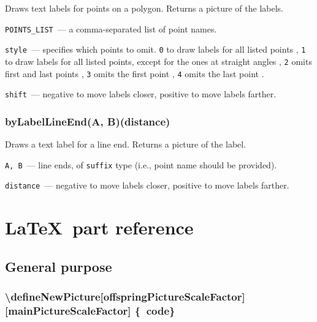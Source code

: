 	Draws text labels for points on a polygon. Returns a picture of the labels.
	
	
	\texttt{POINTS\_LIST}~— a comma-separated list of point names.
	
	\texttt{style}~— specifies which points to omit. \texttt{0} to draw labels for all listed points
	, \texttt{1} to draw labels for all listed points, except for the ones at straight angles
	, \texttt{2} omits first and last points
	, \texttt{3} omits the first point
	, \texttt{4} omits the last point
	.
	
	\texttt{shift}~— negative to move labels closer, positive to move labels farther.

\subsubsection{byLabelLineEnd(A, B)(distance)}\label{byLabelLineEnd}
	
	Draws a text label for a line end. Returns a picture of the label.
	
	\texttt{A, B}~— line ends, of \texttt{suffix} type (i.e., point name should be provided).
	
	\texttt{distance}~— negative to move labels closer, positive to move labels farther.


\section{\LaTeX\ part reference}

\subsection{General purpose}

\subsubsection{\textbackslash defineNewPicture[offspringPictureScaleFactor] [mainPictureScaleFactor] \{\METAPOST\ code\}}\label{defineNewPicture}

